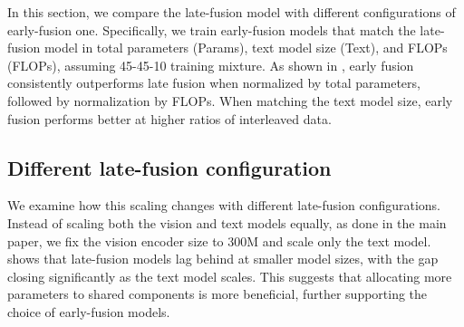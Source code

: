 In this section, we compare the late-fusion model with different configurations
of early-fusion one. Specifically, we train early-fusion models that match the
late-fusion model in total parameters (Params), text model size (Text), and
FLOPs (FLOPs), assuming 45-45-10 training mixture. As shown in
, early fusion consistently
outperforms late fusion when normalized by total parameters, followed by
normalization by FLOPs. When matching the text model size, early fusion performs
better at higher ratios of interleaved data. 







\subsection{Different late-fusion configuration} 
We examine how this scaling changes with different late-fusion configurations. Instead of scaling both the vision and text models equally, as done in the main paper, we fix the vision encoder size to 300M and scale only the text model.  shows that late-fusion models lag behind at smaller model sizes, with the gap closing significantly as the text model scales. This suggests that allocating more parameters to shared components is more beneficial, further supporting the choice of early-fusion models.











